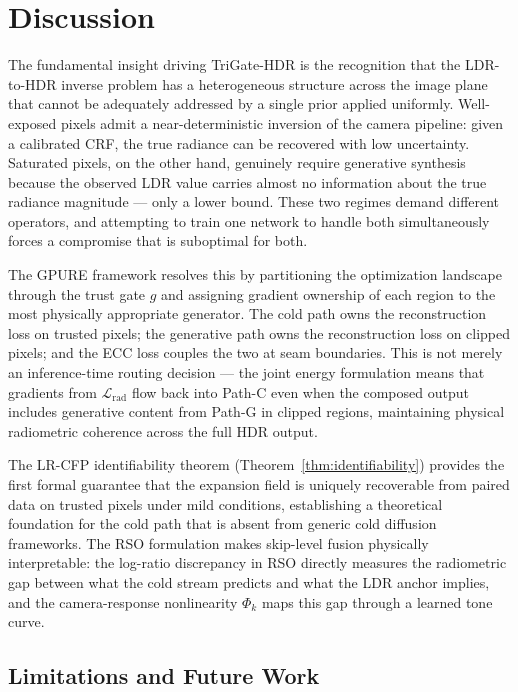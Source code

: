 \documentclass[10pt,twocolumn,letterpaper]{article}
\newcommand{\Lrad}{\mathcal{L}_{\mathrm{rad}}}
\begin{document}
\section{Discussion}
\label{sec:discussion}

The fundamental insight driving TriGate-HDR is the recognition that the LDR-to-HDR inverse problem has a heterogeneous structure across the image plane that cannot be adequately addressed by a single prior applied uniformly. Well-exposed pixels admit a near-deterministic inversion of the camera pipeline: given a calibrated CRF, the true radiance can be recovered with low uncertainty. Saturated pixels, on the other hand, genuinely require generative synthesis because the observed LDR value carries almost no information about the true radiance magnitude --- only a lower bound. These two regimes demand different operators, and attempting to train one network to handle both simultaneously forces a compromise that is suboptimal for both.

The GPURE framework resolves this by partitioning the optimization landscape through the trust gate $g$ and assigning gradient ownership of each region to the most physically appropriate generator. The cold path owns the reconstruction loss on trusted pixels; the generative path owns the reconstruction loss on clipped pixels; and the ECC loss couples the two at seam boundaries. This is not merely an inference-time routing decision --- the joint energy formulation means that gradients from $\Lrad$ flow back into Path-C even when the composed output includes generative content from Path-G in clipped regions, maintaining physical radiometric coherence across the full HDR output.

The LR-CFP identifiability theorem (Theorem~\ref{thm:identifiability}) provides the first formal guarantee that the expansion field is uniquely recoverable from paired data on trusted pixels under mild conditions, establishing a theoretical foundation for the cold path that is absent from generic cold diffusion frameworks. The RSO formulation makes skip-level fusion physically interpretable: the log-ratio discrepancy in RSO directly measures the radiometric gap between what the cold stream predicts and what the LDR anchor implies, and the camera-response nonlinearity $\Phi_k$ maps this gap through a learned tone curve.

\subsection{Limitations and Future Work}
\end{document}
